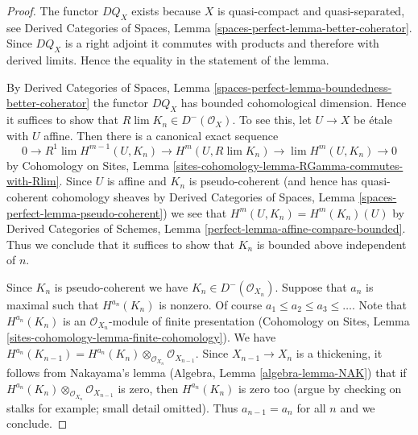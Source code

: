 \documentclass[10pt,a4paper]{amsart}
\theoremstyle{plain}
\theoremstyle{definition}
\theoremstyle{remark}
\numberwithin{equation}{subsection}
\def\lim{\mathop{\mathrm{lim}}\nolimits}
\begin{document}
\begin{proof}
The functor $DQ_X$ exists because $X$ is quasi-compact and
quasi-separated, see Derived Categories of Spaces, Lemma
\ref{spaces-perfect-lemma-better-coherator}.
Since $DQ_X$ is a right adjoint it commutes with products
and therefore with derived limits. Hence the equality
in the statement of the lemma.

\medskip\noindent
By Derived Categories of Spaces,
Lemma \ref{spaces-perfect-lemma-boundedness-better-coherator}
the functor $DQ_X$ has bounded cohomological dimension.
Hence it suffices to show that $R\lim K_n \in D^-(\mathcal{O}_X)$.
To see this, let $U \to X$ be \'etale with $U$ affine.
Then there is a canonical exact sequence
$$
0 \to
R^1\lim H^{m - 1}(U, K_n) \to H^m(U, R\lim K_n) \to
\lim H^m(U, K_n) \to 0
$$
by Cohomology on Sites, Lemma
\ref{sites-cohomology-lemma-RGamma-commutes-with-Rlim}.
Since $U$ is affine and $K_n$ is pseudo-coherent (and hence has
quasi-coherent cohomology sheaves by
Derived Categories of Spaces, Lemma \ref{spaces-perfect-lemma-pseudo-coherent})
we see that $H^m(U, K_n) = H^m(K_n)(U)$ by
Derived Categories of Schemes, Lemma \ref{perfect-lemma-affine-compare-bounded}.
Thus we conclude that it suffices to show that $K_n$
is bounded above independent of $n$.

\medskip\noindent
Since $K_n$ is pseudo-coherent we have $K_n \in D^-(\mathcal{O}_{X_n})$.
Suppose that $a_n$ is maximal such that $H^{a_n}(K_n)$ is nonzero.
Of course $a_1 \leq a_2 \leq a_3 \leq \ldots$.
Note that $H^{a_n}(K_n)$ is an
$\mathcal{O}_{X_n}$-module of finite presentation
(Cohomology on Sites, Lemma
\ref{sites-cohomology-lemma-finite-cohomology}).
We have $H^{a_n}(K_{n - 1}) =
H^{a_n}(K_n) \otimes_{\mathcal{O}_{X_n}} \mathcal{O}_{X_{n - 1}}$.
Since $X_{n - 1} \to X_n$ is a thickening, it follows from
Nakayama's lemma (Algebra, Lemma \ref{algebra-lemma-NAK}) that if
$H^{a_n}(K_n) \otimes_{\mathcal{O}_{X_n}} \mathcal{O}_{X_{n - 1}}$
is zero, then $H^{a_n}(K_n)$ is zero too (argue by checking on stalks
for example; small detail omitted).
Thus $a_{n - 1} = a_n$ for all $n$ and we conclude.
\end{proof}
\end{document}
